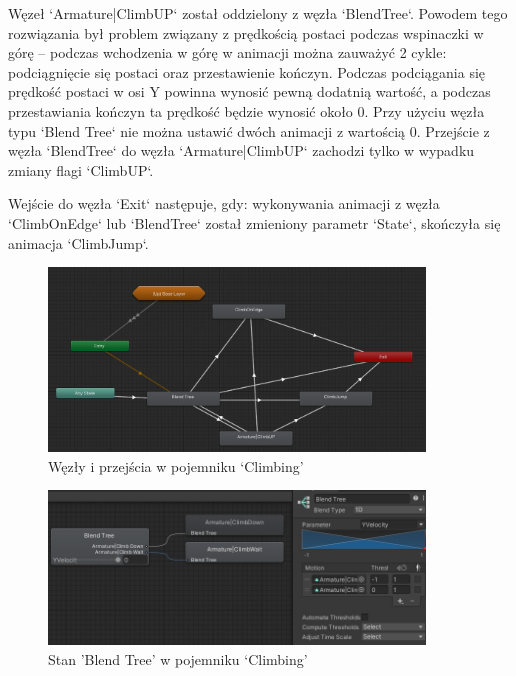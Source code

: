 \documentclass[12pt,twoside]{article}
\begin{document}
Węzeł `Armature|ClimbUP` został oddzielony z węzła `BlendTree`. Powodem tego
rozwiązania był problem związany z prędkością postaci podczas wspinaczki w górę
– podczas wchodzenia w górę w animacji można zauważyć 2 cykle: podciągnięcie się
postaci oraz przestawienie kończyn. Podczas podciągania się prędkość postaci w
osi Y powinna wynosić pewną dodatnią wartość, a podczas przestawiania
kończyn ta prędkość będzie wynosić około 0. Przy użyciu węzła typu `Blend Tree`
nie można ustawić dwóch animacji z wartością 0. Przejście z węzła  `BlendTree`
do węzła `Armature|ClimbUP` zachodzi tylko w wypadku zmiany flagi `ClimbUP`. 

Wejście do węzła `Exit` następuje, gdy: wykonywania animacji z węzła
`ClimbOnEdge` lub `BlendTree`  został zmieniony parametr `State`, skończyła się
animacja `ClimbJump`. 
\begin{figure}[ht]
    \centering
	\includegraphics[width=10cm]{RealizacjaProjektu/UnityPictires/Animator/Player1_Animator_Climbing.jpg}
	\caption{Węzły i przejścia w pojemniku `Climbing'}
    \label{Hero:Aniamtor:Climbing}
\end{figure}
\begin{figure}[ht]
    \centering
	\includegraphics[width=10cm]{RealizacjaProjektu/UnityPictires/Animator/Player1_Animator_Climbing_blendTree.jpg}
	\caption{Stan 'Blend Tree' w pojemniku `Climbing'}
    \label{Hero:Aniamtor:ClimbingBlend}
\end{figure}
\linebreak
\linebreak
\linebreak
\linebreak
\end{document}
